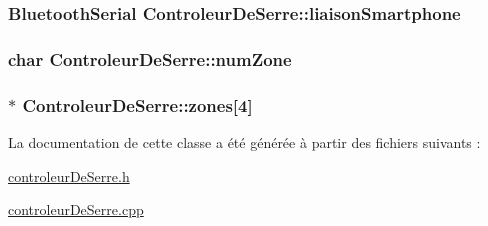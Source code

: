 \subsubsection[{\texorpdfstring{liaison\+Smartphone}{liaisonSmartphone}}]{\setlength{\rightskip}{0pt plus 5cm}Bluetooth\+Serial Controleur\+De\+Serre\+::liaison\+Smartphone\hspace{0.3cm}{\ttfamily [private]}}\hypertarget{class_controleur_de_serre_a256aa95390c10b20876951613411372d}{}\label{class_controleur_de_serre_a256aa95390c10b20876951613411372d}
\subsubsection[{\texorpdfstring{num\+Zone}{numZone}}]{\setlength{\rightskip}{0pt plus 5cm}char Controleur\+De\+Serre\+::num\+Zone\hspace{0.3cm}{\ttfamily [private]}}\hypertarget{class_controleur_de_serre_a743d1b27b4f77a807a199ef418a236d4}{}\label{class_controleur_de_serre_a743d1b27b4f77a807a199ef418a236d4}
\subsubsection[{\texorpdfstring{zones}{zones}}]{$\ast$ Controleur\+De\+Serre\+::zones\mbox{[}4\mbox{]}}\hypertarget{class_controleur_de_serre_ad0cfc26f13ccea8cc304763caa32d3a5}{}\label{class_controleur_de_serre_ad0cfc26f13ccea8cc304763caa32d3a5}


La documentation de cette classe a été générée à partir des fichiers suivants \+:\begin{DoxyCompactItemize}
\item 
\hyperlink{controleur_de_serre_8h}{controleur\+De\+Serre.\+h}\item 
\hyperlink{controleur_de_serre_8cpp}{controleur\+De\+Serre.\+cpp}\end{DoxyCompactItemize}
